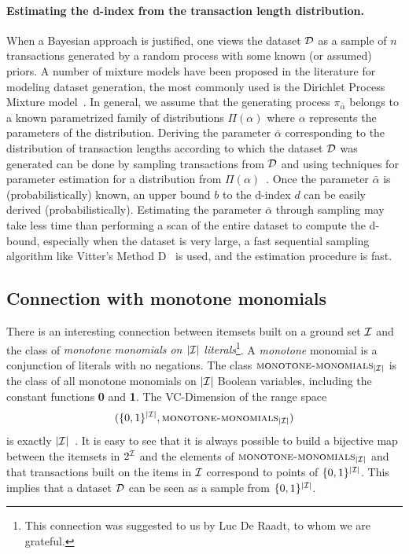 \paragraph{Estimating the d-index from the transaction length distribution.} When
a Bayesian approach is justified, one views the dataset ${\cal D}$ as a sample of $n$
transactions generated by a random process with some known (or assumed) priors.
A number of mixture models have been proposed in the literature for modeling
dataset generation, the most commonly used is the Dirichlet Process Mixture
model~\citep{HeS12}.
In general, we assume that the generating process 
$\pi_{\bar{\alpha}}$ belongs to a known parametrized family of distributions
$\Pi(\alpha)$ where $\alpha$ represents the parameters of the distribution.
Deriving the parameter $\bar\alpha$ corresponding to the distribution of
transaction lengths according to which the dataset ${\cal D}$ was generated can be
done by sampling transactions from ${\cal D}$ and using techniques for parameter
estimation for a distribution from $\Pi(\alpha)$~\citep{LehmannC98,HastieTF09}.
Once the parameter $\bar\alpha$ is (probabilistically) known, an upper bound $b$
to the d-index $d$ can be easily derived (probabilistically).  
Estimating the parameter $\bar\alpha$ through sampling may take less time than
performing a scan of the entire dataset to compute the d-bound, especially when
the dataset is very large, a fast sequential sampling algorithm like Vitter's
Method D~\citep{Vitter87} is used, and the estimation procedure is fast.

\subsection{Connection with monotone monomials}\label{sec:vcminemonomials}
There is an interesting connection between itemsets built on a ground set
${\cal I}$ and 
the class of \emph{monotone monomials on $|{\cal I}|$ literals}\footnote{This
connection was suggested to us by Luc De Raadt, to whom we are grateful.}. 
A \emph{monotone} monomial is a conjunction of literals with no negations. The
class $\textsc{monotone-monomials}_{|{\cal I}|}$ is the class of
all monotone monomials on $|{\cal I}|$ Boolean variables, including the constant functions
{\bf 0} and {\bf 1}. The VC-Dimension of the range space
\[
(\{0,1\}^{|{\cal I}|},\textsc{monotone-monomials}_{|{\cal I}|})\]
is exactly $|{\cal I}|$~\cite[Coroll.~3]{NatschlagerS96}. It is easy to see that it is always
possible to build a bijective map between the itemsets in $2^{\cal I}$ and the
elements of $\textsc{monotone-monomials}_{|{\cal I}|}$ and that transactions built
on the items in ${\cal I}$ correspond to points of $\{0,1\}^{|{\cal I}|}$. This implies
that a dataset ${\cal D}$ can be seen as a sample from $\{0,1\}^{|{\cal I}|}$.

